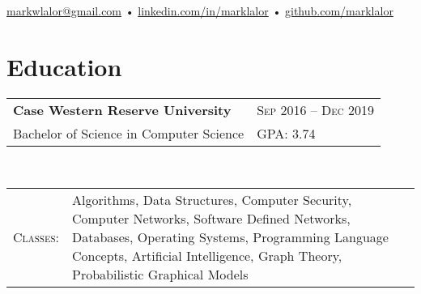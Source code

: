 \documentclass[a4paper,11pt]{article}
\begin{document}
\pagestyle{empty} %

\par{\par}
\begin{center}
\href{mailto:markwlalor@gmail.com}{markwlalor@gmail.com} • \href{https://linkedin.com/in/marklalor/}{linkedin.com/in/marklalor} • \href{http://github.com/marklalor}{github.com/marklalor}
\end{center}


\section{Education}
\begin{tabular}{lp{15cm}}
\textbf{Case Western Reserve University} & \textsc{Sep 2016 – Dec 2019} \\
Bachelor of Science in Computer Science & GPA: 3.74\\
\end{tabular} \\
\begin{tabular}{rp{16cm}}
\textsc{Classes}: & Algorithms, Data Structures, Computer Security, Computer Networks, Software Defined Networks, Databases, Operating Systems, Programming Language Concepts, Artificial Intelligence, Graph Theory, Probabilistic Graphical Models
\end{tabular}
\end{document}
